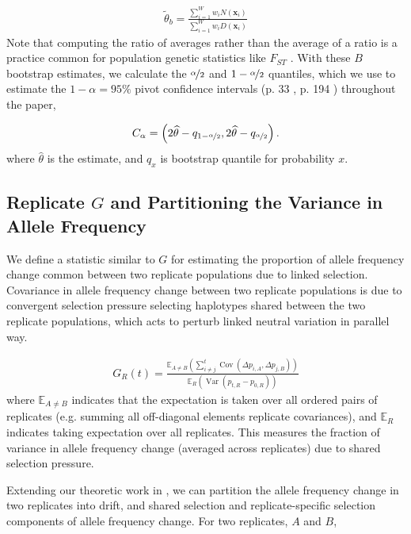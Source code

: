\documentclass[11pt]{article}
\newcommand{\E}{\mathbb{E}}
\DeclareMathOperator{\var}{Var}
\DeclareMathOperator{\cov}{Cov}
\begin{document}
\begin{align}
  \tilde{\theta}_b = \frac{\sum_{i=1}^W w_i N(\mathbf{x}_i)}{\sum_{i=1}^W w_i D(\mathbf{x}_i)}
\end{align}
%
Note that computing the ratio of averages rather than the average of a ratio is
a practice common for population genetic statistics like $F_{ST}$
\parencite{Bhatia2013-zy}. With these $B$ bootstrap estimates, we calculate the
$\nicefrac{\alpha}{2}$ and $1-\nicefrac{\alpha}{2}$ quantiles, which we use to
estimate the $1-\alpha = 95\%$ pivot confidence intervals (p. 33
\cite{Wasserman2006-jl}, p. 194 \cite{Davison2013-oy}) throughout the paper,

\begin{align}
  C_\alpha = \left(2 \widehat{\theta} - q_{1-\nicefrac{\alpha}{2}}, 2 \widehat{\theta} - q_{\nicefrac{\alpha}{2}} \right).
\end{align}
%
where $\widehat{\theta}$ is the estimate, and $q_x$ is bootstrap quantile for
probability $x$.

\subsection{Replicate $G$ and Partitioning the Variance in Allele Frequency}
\label{supp:replicate-g}

We define a statistic similar to $G$ for estimating the proportion of allele
frequency change common between two replicate populations due to linked
selection. Covariance in allele frequency change between two replicate
populations is due to convergent selection pressure selecting haplotypes shared
between the two replicate populations, which acts to perturb linked neutral
variation in parallel way. 

\begin{align}
  G_R(t) = \frac{\E_{A \ne B}(\sum_{i\ne j}^t \cov(\Delta p_{i,A}, \Delta p_{j,B}))}{\E_R(\var(p_{t,R} - p_{0,R}))}
\end{align}
%
where $\E_{A \ne B}$ indicates that the expectation is taken over all ordered
pairs of replicates (e.g. summing all off-diagonal elements replicate
covariances), and $\E_R$ indicates taking expectation over all replicates. This
measures the fraction of variance in allele frequency change (averaged across
replicates) due to shared selection pressure.

Extending our theoretic work in \textcite{Buffalo2019-io}, we can partition the
allele frequency change in two replicates into drift, and shared selection and
replicate-specific selection components of allele frequency change. For two
replicates, $A$ and $B$, 
\end{document}
